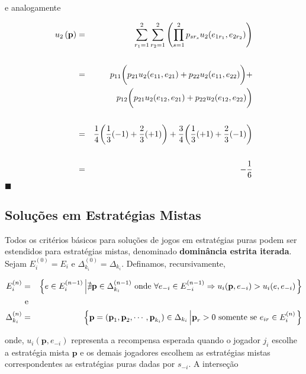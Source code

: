 \begin{ex}
e analogamente

\begin{eqnarray}
u_2\left(\textbf{p}\right) & = & \sum_{r_1=1}^{2}\sum_{r_2=1}^{2}\left(\prod_{s=1}^{2}{p_{sr_s}u_2(e_{1r_1},e_{2r_2})}\right)\nonumber\\\nonumber\\
 & = & p_{11}\bigg(p_{21}u_2(e_{11},e_{21})+p_{22}u_2(e_{11},e_{22})\bigg)+\nonumber\\
& & p_{12}\bigg(p_{21}u_2(e_{12},e_{21})+p_{22}u_2(e_{12},e_{22})\bigg)\nonumber\\\nonumber\\
& = & \dfrac{1}{4}\bigg(\dfrac{1}{3}(-1)+\dfrac{2}{3}(+1)\bigg)+\dfrac{3}{4}\bigg(\dfrac{1}{3}(+1)+\dfrac{2}{3}(-1)\bigg)\nonumber\\\nonumber\\
& = & -\dfrac{1}{6}\nonumber\vspace{0.1cm}
\end{eqnarray}
\hfill$\blacksquare$
\end{ex}

\subsection{Soluções em Estratégias Mistas}

Todos os critérios básicos para soluções de jogos em estratégias puras podem ser estendidos para estratégias mistas, denominado \textbf{dominância estrita iterada}. Sejam $E_i^{(0)}=E_i$ e $\Delta_{k_i}^{(0)} = \Delta_{k_i}$. Definamos, recursivamente, 

\begin{eqnarray}
E_i^{(n)} & = & \left\{e\in E_i^{(n-1)}\left|\nexists\textbf{p}\in\Delta_{k_i}^{(n-1)}\text{ onde }\forall e_{-i}\in E_{-i}^{(n-1)}\Rightarrow u_i(\textbf{p},e_{-i})>u_i(e,e_{-i})\right.\right\}\nonumber\\\vspace{0.1cm}
& \text{ e } & \nonumber\\\vspace{0.1cm}
\Delta_{k_i}^{(n)} & = & \left\{\textbf{p}=(\textbf{p}_1,\textbf{p}_2,\cdots,\textbf{p}_{k_i})\in \Delta_{k_i}\left|\textbf{p}_r>0 \text{ somente se } e_{ir}\in E_{i}^{(n)}\right.\right\}\nonumber
\end{eqnarray}\vspace{0.1cm}

onde, $u_i(\textbf{p}, e_{-i})$ representa a recompensa esperada quando o jogador $j_i$ escolhe a estratégia mista $\textbf{p}$ e os demais jogadores escolhem as estratégias mistas correspondentes as estratégias puras dadas por $s_{-i}$. A interseção 

